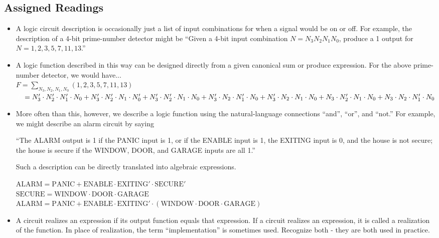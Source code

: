 \documentclass[10pt,a4paper]{article}
\begin{document}
\subsection{Assigned Readings}
\begin{itemize}
\item A logic circuit description is occasionally just a list of input combinations for when a signal would be on or off. For example, the description of a 4-bit prime-number detector might be ``Given a 4-bit input combination $N=N_3N_2N_1N_0$, produce a 1 output for $N=1,2,3,5,7,11,13$.''\pagebreak
\item A logic function described in this way can be designed directly from a given canonical sum or produce expression. For the above prime-number detector, we would have...\\
$F=\sum_{N_3,N_2,N_1,N_0}(1,2,3,5,7,11,13)$\\
$\textcolor{white}{F}=N_3'\cdot N_2'\cdot N_1'\cdot N_0+N_3'\cdot N_2'\cdot N_1\cdot N_0'+N_3'\cdot N_2'\cdot N_1\cdot N_0+N_3'\cdot N_2\cdot N_1'\cdot N_0+N_3'\cdot N_2\cdot N_1\cdot N_0+N_3\cdot N_2'\cdot N_1\cdot N_0+N_3\cdot N_2\cdot N_1'\cdot N_0$
\item More often than this, however, we describe a logic function using the natural-language connections ``and'', ``or'', and ``not.'' For example, we might describe an alarm circuit by saying 
\begin{displayquote}
``The ALARM output is 1 if the PANIC input is 1, or if the ENABLE input is 1, the EXITING input is 0, and the house is not secure; the house is secure if the WINDOW, DOOR, and GARAGE inputs are all 1.''
\end{displayquote}
Such a description can be directly translated into algebraic expressions.
\begin{displayquote}
$\text{ALARM}=\text{PANIC}+\text{ENABLE}\cdot\text{EXITING}'\cdot\text{SECURE}'$\\
$\text{SECURE}=\text{WINDOW}\cdot\text{DOOR}\cdot\text{GARAGE}$\\
$\text{ALARM}=\text{PANIC}+\text{ENABLE}\cdot \text{EXITING}'\cdot(\text{WINDOW}\cdot\text{DOOR}\cdot\text{GARAGE})$
\end{displayquote}
\item A circuit realizes an expression if its output function equals that expression. If a circuit realizes an expression, it is called a realization of the function. In place of realization, the term ``implementation'' is sometimes used. Recognize both - they are both used in practice.

\end{itemize}
\end{document}
